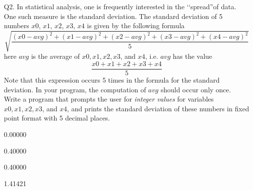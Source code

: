 Q2. In statistical analysis, one is frequently interested in the
\lq\lq spread''of data. One such measure is the
standard deviation.
The standard deviation of 5 numbers
$x0$, $x1$, $x2$, $x3$, $x4$ is given by the following
formula
\[
\sqrt{
\frac{
(x0 - avg)^2 + (x1 - avg)^2 + (x2 - avg)^2 + (x3 - avg)^2 +(x4 - avg)^2
}
{5}
}
\]
here $avg$ is the average of 
$x0,x1,x2,x3$, and $x4$, i.e. $avg$ has the value
\[
\frac{x0 + x1 + x2 + x3 + x4}{5}
\]
Note that this expression occurs 5 times in the formula for the 
standard deviation. 
In your program, the
computation of $avg$ should occur only once. 
Write a program that prompts the user for \textit{integer values}
for variables $x0,x1,x2,x3$, and $x4$, and prints the 
standard deviation of these numbers in fixed point
format with 5 decimal places.

\resett
\nextt
\begin{console}[commandchars=\\\{\}]
0.00000
\end{console}

\nextt
\begin{console}[commandchars=\\\{\}]
0.40000
\end{console}

\nextt
\begin{console}[commandchars=\\\{\}]
0.40000
\end{console}

\nextt
\begin{console}[commandchars=\\\{\}]
1.41421
\end{console}
